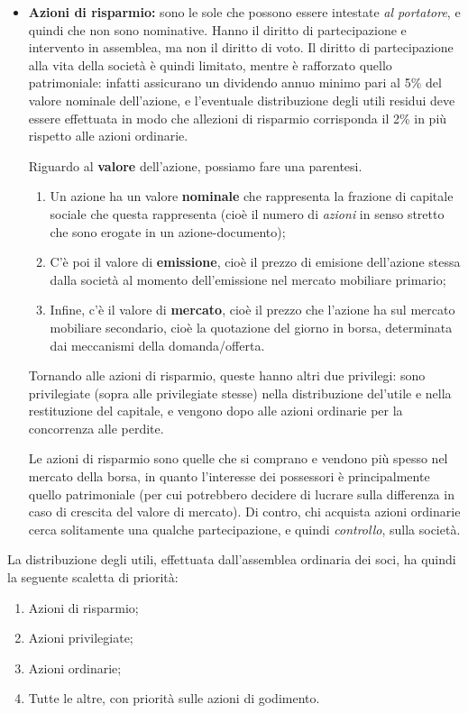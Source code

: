 \documentclass[a4paper,11pt]{article}
\begin{document}
\begin{itemize}
\begin{itemize}
			\item \textbf{Azioni di risparmio:} sono le sole che possono essere intestate \textit{al portatore}, e quindi che non sono nominative.
				Hanno il diritto di partecipazione e intervento in assemblea, ma non il diritto di voto.
				Il diritto di partecipazione alla vita della società è quindi limitato, mentre è rafforzato quello patrimoniale: infatti assicurano un dividendo annuo minimo pari al 5\% del valore nominale dell'azione, e l'eventuale distribuzione degli utili residui deve essere effettuata in modo che allezioni di risparmio corrisponda il 2\% in più rispetto alle azioni ordinarie.

				Riguardo al \textbf{valore} dell'azione, possiamo fare una parentesi.
				\begin{enumerate}
					\item Un azione ha un valore \textbf{nominale} che rappresenta la frazione di capitale sociale che questa rappresenta (cioè il numero di \textit{azioni} in senso stretto che sono erogate in un azione-documento);
					\item C'è poi il valore di \textbf{emissione}, cioè il prezzo di emisione dell'azione stessa dalla società al momento dell'emissione nel mercato mobiliare primario;
					\item Infine, c'è il valore di \textbf{mercato}, cioè il prezzo che l'azione ha sul mercato mobiliare secondario, cioè la quotazione del giorno in borsa, determinata dai meccanismi della domanda/offerta.
				\end{enumerate}

				Tornando alle azioni di risparmio, queste hanno altri due privilegi: sono privilegiate (sopra alle privilegiate stesse) nella distribuzione del'utile e nella restituzione del capitale, e vengono dopo alle azioni ordinarie per la concorrenza alle perdite.

				Le azioni di risparmio sono quelle che si comprano e vendono più spesso nel mercato della borsa, in quanto l'interesse dei possessori è principalmente quello patrimoniale (per cui potrebbero decidere di lucrare sulla differenza in caso di crescita del valore di mercato).
				Di contro, chi acquista azioni ordinarie cerca solitamente una qualche partecipazione, e quindi \textit{controllo}, sulla società. 
		\end{itemize}
\end{itemize}

La distribuzione degli utili, effettuata dall'assemblea ordinaria dei soci, ha quindi la seguente scaletta di priorità:
\begin{enumerate}
	\item Azioni di risparmio;
	\item Azioni privilegiate;
	\item Azioni ordinarie;
	\item Tutte le altre, con priorità sulle azioni di godimento. 
\end{enumerate}
\end{document}
